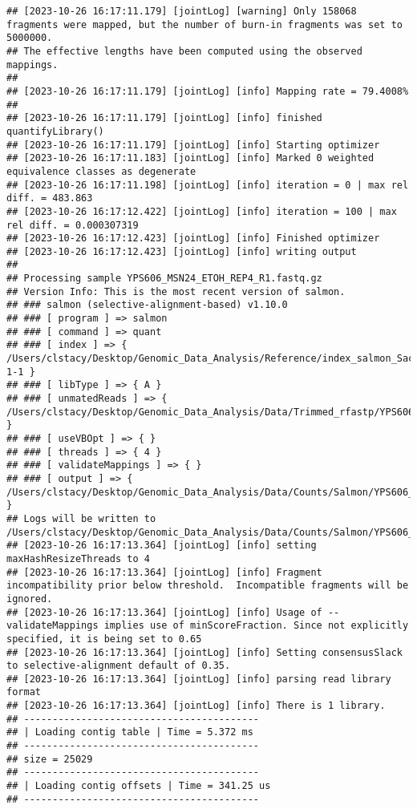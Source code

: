 \documentclass[
]{book}
\begin{document}
\begin{verbatim}
## [2023-10-26 16:17:11.179] [jointLog] [warning] Only 158068 fragments were mapped, but the number of burn-in fragments was set to 5000000.
## The effective lengths have been computed using the observed mappings.
## 
## [2023-10-26 16:17:11.179] [jointLog] [info] Mapping rate = 79.4008%
## 
## [2023-10-26 16:17:11.179] [jointLog] [info] finished quantifyLibrary()
## [2023-10-26 16:17:11.179] [jointLog] [info] Starting optimizer
## [2023-10-26 16:17:11.183] [jointLog] [info] Marked 0 weighted equivalence classes as degenerate
## [2023-10-26 16:17:11.198] [jointLog] [info] iteration = 0 | max rel diff. = 483.863
## [2023-10-26 16:17:12.422] [jointLog] [info] iteration = 100 | max rel diff. = 0.000307319
## [2023-10-26 16:17:12.423] [jointLog] [info] Finished optimizer
## [2023-10-26 16:17:12.423] [jointLog] [info] writing output 
## 
## Processing sample YPS606_MSN24_ETOH_REP4_R1.fastq.gz
## Version Info: This is the most recent version of salmon.
## ### salmon (selective-alignment-based) v1.10.0
## ### [ program ] => salmon 
## ### [ command ] => quant 
## ### [ index ] => { /Users/clstacy/Desktop/Genomic_Data_Analysis/Reference/index_salmon_Saccharomyces_cerevisiae.R64-1-1 }
## ### [ libType ] => { A }
## ### [ unmatedReads ] => { /Users/clstacy/Desktop/Genomic_Data_Analysis/Data/Trimmed_rfastp/YPS606_MSN24_ETOH_REP4_R1.fastq.gz }
## ### [ useVBOpt ] => { }
## ### [ threads ] => { 4 }
## ### [ validateMappings ] => { }
## ### [ output ] => { /Users/clstacy/Desktop/Genomic_Data_Analysis/Data/Counts/Salmon/YPS606_MSN24_ETOH_REP4_R1.fastq.gz_quant }
## Logs will be written to /Users/clstacy/Desktop/Genomic_Data_Analysis/Data/Counts/Salmon/YPS606_MSN24_ETOH_REP4_R1.fastq.gz_quant/logs
## [2023-10-26 16:17:13.364] [jointLog] [info] setting maxHashResizeThreads to 4
## [2023-10-26 16:17:13.364] [jointLog] [info] Fragment incompatibility prior below threshold.  Incompatible fragments will be ignored.
## [2023-10-26 16:17:13.364] [jointLog] [info] Usage of --validateMappings implies use of minScoreFraction. Since not explicitly specified, it is being set to 0.65
## [2023-10-26 16:17:13.364] [jointLog] [info] Setting consensusSlack to selective-alignment default of 0.35.
## [2023-10-26 16:17:13.364] [jointLog] [info] parsing read library format
## [2023-10-26 16:17:13.364] [jointLog] [info] There is 1 library.
## -----------------------------------------
## | Loading contig table | Time = 5.372 ms
## -----------------------------------------
## size = 25029
## -----------------------------------------
## | Loading contig offsets | Time = 341.25 us
## -----------------------------------------

\end{verbatim}
\end{document}
